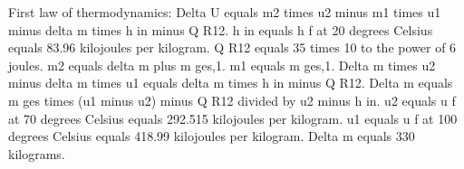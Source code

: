 First law of thermodynamics:  
Delta U equals m2 times u2 minus m1 times u1 minus delta m times h in minus Q R12.  
h in equals h f at 20 degrees Celsius equals 83.96 kilojoules per kilogram.  
Q R12 equals 35 times 10 to the power of 6 joules.  
m2 equals delta m plus m ges,1.  
m1 equals m ges,1.  
Delta m times u2 minus delta m times u1 equals delta m times h in minus Q R12.  
Delta m equals m ges times (u1 minus u2) minus Q R12 divided by u2 minus h in.  
u2 equals u f at 70 degrees Celsius equals 292.515 kilojoules per kilogram.  
u1 equals u f at 100 degrees Celsius equals 418.99 kilojoules per kilogram.  
Delta m equals 330 kilograms.